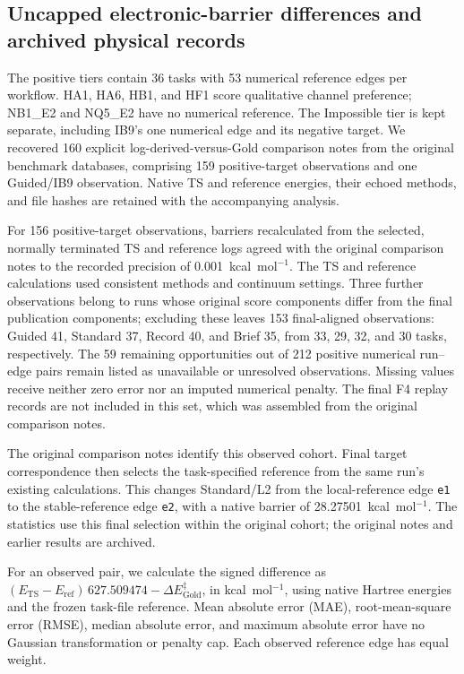 \subsection{Uncapped electronic-barrier differences and archived physical records}
\label{sec:si-archived-barrier-errors}

The positive tiers contain 36 tasks with 53 numerical reference edges per workflow. HA1, HA6, HB1, and HF1 score qualitative channel preference; NB1\_E2 and NQ5\_E2 have no numerical reference. The Impossible tier is kept separate, including IB9's one numerical edge and its negative target. We recovered 160 explicit log-derived-versus-Gold comparison notes from the original benchmark databases, comprising 159 positive-target observations and one Guided/IB9 observation. Native TS and reference energies, their echoed methods, and file hashes are retained with the accompanying analysis.

For 156 positive-target observations, barriers recalculated from the selected, normally terminated TS and reference logs agreed with the original comparison notes to the recorded precision of 0.001~kcal~mol$^{-1}$. The TS and reference calculations used consistent methods and continuum settings. Three further observations belong to runs whose original score components differ from the final publication components; excluding these leaves 153 final-aligned observations: Guided 41, Standard 37, Record 40, and Brief 35, from 33, 29, 32, and 30 tasks, respectively. The 59 remaining opportunities out of 212 positive numerical run--edge pairs remain listed as unavailable or unresolved observations. Missing values receive neither zero error nor an imputed numerical penalty. The final F4 replay records are not included in this set, which was assembled from the original comparison notes.

The original comparison notes identify this observed cohort. Final target correspondence then selects the task-specified reference from the same run's existing calculations. This changes Standard/L2 from the local-reference edge \texttt{e1} to the stable-reference edge \texttt{e2}, with a native barrier of 28.27501~kcal~mol$^{-1}$. The statistics use this final selection within the original cohort; the original notes and earlier results are archived.

For an observed pair, we calculate the signed difference as $(E_{\mathrm{TS}}-E_{\mathrm{ref}})\,627.509474-\Delta E^{\ddagger}_{\mathrm{Gold}}$, in kcal~mol$^{-1}$, using native Hartree energies and the frozen task-file reference. Mean absolute error (MAE), root-mean-square error (RMSE), median absolute error, and maximum absolute error have no Gaussian transformation or penalty cap. Each observed reference edge has equal weight.

